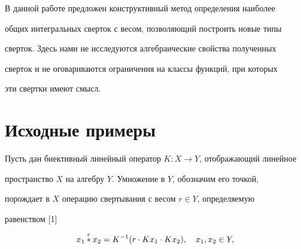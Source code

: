 

\date{}







\pagestyle{plain} %













\maketitle










В данной работе предложен конструктивный метод определения наиболее


общих интегральных сверток с весом, позволяющий построить новые типы


сверток. Здесь нами не исследуются алгебраические свойства полученных


сверток и не оговариваются ограничения на классы функций, при которых


эти свертки имеют смысл.





\section{Исходные примеры}





Пусть дан биективный линейный оператор $K:X\to Y$, отображающий линейное


пространство $X$ на алгебру $Y$. Умножение в $Y$, обозначим его точкой,


порождает в $X$ операцию свертывания с весом $r\in Y$, определяемую


равенством [1]


\begin{equation}


x_1\up{r}{}x_2=K^{-1}(r\cdot Kx_1\cdot Kx_2),\quad


x_1,x_2\in Y,


\end{equation}


